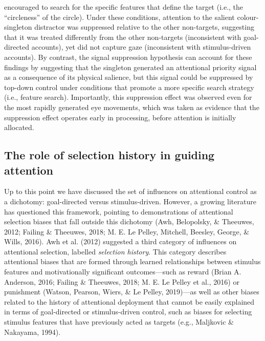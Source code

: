 \documentclass[jou, a4paper, noextraspace,floatsintext]{apa6}
\theoremstyle{definition}
\theoremstyle{definition}
\theoremstyle{definition}
\theoremstyle{remark}
\begin{document}
encouraged to search for the specific features that define the target
(i.e., the \enquote{circleness} of the circle). Under these conditions,
attention to the salient colour-singleton distractor was suppressed
relative to the other non-targets, suggesting that it was treated
differently from the other non-targets (inconsistent with goal-directed
accounts), yet did not capture gaze (inconsistent with stimulus-driven
accounts). By contrast, the signal suppression hypothesis can account
for these findings by suggesting that the singleton generated an
attentional priority signal as a consequence of its physical salience,
but this signal could be suppressed by top-down control under conditions
that promote a more specific search strategy (i.e., feature search).
Importantly, this suppression effect was observed even for the most
rapidly generated eye movements, which was taken as evidence that the
suppression effect operates early in processing, before attention is
initially allocated.

\subsection{The role of selection history in guiding
attention}\label{the-role-of-selection-history-in-guiding-attention}

Up to this point we have discussed the set of influences on attentional
control as a dichotomy: goal-directed versus stimulus-driven. However, a
growing literature has questioned this framework, pointing to
demonstrations of attentional selection biases that fall outside this
dichotomy (Awh, Belopolsky, \& Theeuwes, 2012; Failing \& Theeuwes,
2018; M. E. Le Pelley, Mitchell, Beesley, George, \& Wills, 2016). Awh
et al. (2012) suggested a third category of influences on attentional
selection, labelled \emph{selection history}. This category describes
attentional biases that are formed through learned relationships between
stimulus features and motivationally significant outcomes---such as
reward (Brian A. Anderson, 2016; Failing \& Theeuwes, 2018; M. E. Le
Pelley et al., 2016) or punishment (Watson, Pearson, Wiers, \& Le
Pelley, 2019)---as well as other biases related to the history of
attentional deployment that cannot be easily explained in terms of
goal-directed or stimulus-driven control, such as biases for selecting
stimulus features that have previously acted as targets (e.g., Maljkovic
\& Nakayama, 1994).
\end{document}
